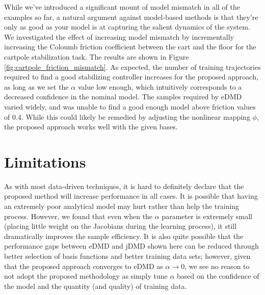 \documentclass{article}
\begin{document}
While we've introduced a significant mount of model mismatch in all of the examples so far, 
a natural argument against model-based methods is that they're only as good as your model is
at capturing the salient dynamics of the system. We investigated the effect of increasing
model mismatch by incrementally increasing the Coloumb friction coefficient between the cart
and the floor for the cartpole stabilization task. The results are shown in Figure 
\ref{fig:cartpole_friction_mismatch}. As expected, the number of training trajectories 
required to find a good stabilizing controller increases for the proposed approach, as long 
as we set the $\alpha$ value low enough, which intuitively corresponds to a decreased 
confidence in the nominal model. The samples required by eDMD varied widely, and was unable 
to find a good enough model above friction values of 0.4. While this could likely be
remedied by adjusting the nonlinear mapping $\phi$, the proposed approach works well with
the given bases.

      
\section{Limitations} \label{sec:limitations}
As with most data-driven techniques, it is hard to definitely declare that the proposed 
method will increase performance in all cases. It is possible that having an extremely poor
analytical model may hurt rather than help the training process. However, we found that even
when the $\alpha$ parameter is extremely small (placing little weight on the Jacobians 
during the learning process), it still dramatically improves the sample efficiency. It is 
also quite possible that the performance gaps between eDMD and jDMD shown here can be 
reduced through better selection of basis functions and better training data sets; however,
given that the proposed approach converges to eDMD as $\alpha \rightarrow 0$, we see no 
reason to not adopt the proposed methodology as simply tune $\alpha$ based on the 
confidence of the model and the quantity (and quality) of training data.


\end{document}
